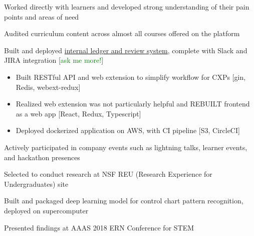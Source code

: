 \documentclass[letterpaper]{deedy-resume} %
\begin{document}
\begin{minipage}[t]{1.0\textwidth}
\sectionspace %



\begin{tightitemize}
\item Worked directly with learners and developed strong understanding of their pain points and areas of need
\item Audited curriculum content across almost all courses offered on the platform
\item Built and deployed \href{https://cxp.codecademy.com}{internal ledger and review system}, complete with Slack and JIRA integration [\textcolor{green}{ask me more!}]
  \begin{itemize}
  \item Built RESTful API and web extension to simplify workflow for CXPs [gin, Redis, webext-redux]
  \item Realized web extension was not particularly helpful and REBUILT frontend as a web app [React, Redux, Typescript]
  \item Deployed dockerized application on AWS, with CI pipeline [S3, CircleCI]
  \end{itemize}
\item Actively participated in company events such as lightning talks, learner events, and hackathon presences
\end{tightitemize}

\sectionspace %



\begin{tightitemize}
\item Selected to conduct research at NSF REU (Research Experience for Undergraduates) site
\item Built and packaged deep learning model for control chart pattern recognition, deployed on supercomputer
\item Presented findings at AAAS 2018 ERN Conference for STEM
\end{tightitemize}


\end{minipage}
\end{document}
